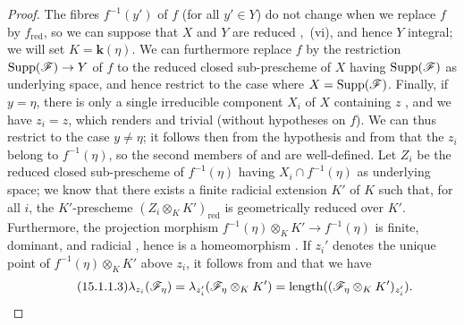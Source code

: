 \begin{proof}
\label{IV.15.1.1-proof}
The fibres $f^{-1}(y')$ of $f$ (for all $y'\in Y$) do not change when we replace $f$ by $f_\mathrm{red}$, so we can suppose that $X$ and $Y$ are reduced ,~(vi), and hence $Y$ integral; we will set $K=\boldsymbol{k}(\eta)$.
We can furthermore replace $f$ by the restriction $\operatorname{Supp}(\mathscr{F})\to Y$ of $f$ to the reduced closed sub-prescheme of $X$ having $\operatorname{Supp}(\mathscr{F})$ as underlying space, and hence restrict to the case where $X=\operatorname{Supp}(\mathscr{F})$.
Finally, if $y=\eta$, there is only a single irreducible component $X_i$ of $X$ containing $z$ , and we have $z_i=z$, which renders  and  trivial (without hypotheses on $f$).
We can thus restrict to the case $y\neq\eta$; it follows then from the hypothesis and from  that the $z_i$ belong to $f^{-1}(\eta)$, so the second members of  and  are well-defined.
Let $Z_i$ be the reduced closed sub-prescheme of $f^{-1}(\eta)$ having $X_i\cap f^{-1}(\eta)$ as underlying space; we know  that there exists a finite radicial extension $K'$ of $K$ such that, for all $i$, the $K'$-prescheme $(Z_i\otimes_KK')_\mathrm{red}$ is geometrically reduced over $K'$.
Furthermore, the projection morphism $f^{-1}(\eta)\otimes_KK'\to f^{-1}(\eta)$ is finite, dominant, and radicial , hence is a homeomorphism .
If $z_i'$ denotes the unique point of $f^{-1}(\eta)\otimes_KK'$ above $z_i$, it follows from  and  that we have
\[
\tag{15.1.1.3}
\label{IV.15.1.1.3}
  \lambda_{z_i}(\mathscr{F}_\eta)=\lambda_{z_i'}(\mathscr{F}_\eta\otimes_KK')=\operatorname{length}((\mathscr{F}_\eta\otimes_KK')_{z_i'}).
\]


\end{proof}
